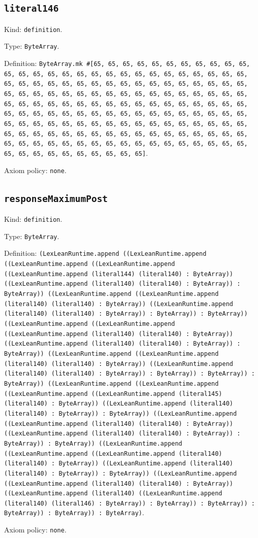 \documentclass[11pt]{article}
\begin{document}
\subsection*{\texttt{literal146}}
\noindent Kind: \texttt{definition}.\par
\noindent Type: \texttt{ByteArray}.\par
\noindent Definition: \texttt{ByteArray.mk \#[65, 65, 65, 65, 65, 65, 65, 65, 65, 65, 65, 65, 65, 65, 65, 65, 65, 65, 65, 65, 65, 65, 65, 65, 65, 65, 65, 65, 65, 65, 65, 65, 65, 65, 65, 65, 65, 65, 65, 65, 65, 65, 65, 65, 65, 65, 65, 65, 65, 65, 65, 65, 65, 65, 65, 65, 65, 65, 65, 65, 65, 65, 65, 65, 65, 65, 65, 65, 65, 65, 65, 65, 65, 65, 65, 65, 65, 65, 65, 65, 65, 65, 65, 65, 65, 65, 65, 65, 65, 65, 65, 65, 65, 65, 65, 65, 65, 65, 65, 65, 65, 65, 65, 65, 65, 65, 65, 65, 65, 65, 65, 65, 65, 65, 65, 65, 65, 65, 65, 65, 65, 65, 65, 65, 65, 65, 65, 65, 65, 65, 65, 65, 65, 65, 65, 65, 65, 65, 65, 65, 65, 65, 65, 65, 65, 65, 65, 65, 65, 65, 65, 65, 65, 65, 65, 65, 65]}.\par
\noindent Axiom policy: \texttt{none}.\par
\subsection*{\texttt{responseMaximumPost}}
\noindent Kind: \texttt{definition}.\par
\noindent Type: \texttt{ByteArray}.\par
\noindent Definition: \texttt{(LexLeanRuntime.append ((LexLeanRuntime.append ((LexLeanRuntime.append ((LexLeanRuntime.append ((LexLeanRuntime.append (literal144) (literal140) : ByteArray)) ((LexLeanRuntime.append (literal140) (literal140) : ByteArray)) : ByteArray)) ((LexLeanRuntime.append ((LexLeanRuntime.append (literal140) (literal140) : ByteArray)) ((LexLeanRuntime.append (literal140) (literal140) : ByteArray)) : ByteArray)) : ByteArray)) ((LexLeanRuntime.append ((LexLeanRuntime.append ((LexLeanRuntime.append (literal140) (literal140) : ByteArray)) ((LexLeanRuntime.append (literal140) (literal140) : ByteArray)) : ByteArray)) ((LexLeanRuntime.append ((LexLeanRuntime.append (literal140) (literal140) : ByteArray)) ((LexLeanRuntime.append (literal140) (literal140) : ByteArray)) : ByteArray)) : ByteArray)) : ByteArray)) ((LexLeanRuntime.append ((LexLeanRuntime.append ((LexLeanRuntime.append ((LexLeanRuntime.append (literal145) (literal140) : ByteArray)) ((LexLeanRuntime.append (literal140) (literal140) : ByteArray)) : ByteArray)) ((LexLeanRuntime.append ((LexLeanRuntime.append (literal140) (literal140) : ByteArray)) ((LexLeanRuntime.append (literal140) (literal140) : ByteArray)) : ByteArray)) : ByteArray)) ((LexLeanRuntime.append ((LexLeanRuntime.append ((LexLeanRuntime.append (literal140) (literal140) : ByteArray)) ((LexLeanRuntime.append (literal140) (literal140) : ByteArray)) : ByteArray)) ((LexLeanRuntime.append ((LexLeanRuntime.append (literal140) (literal140) : ByteArray)) ((LexLeanRuntime.append (literal140) ((LexLeanRuntime.append (literal140) (literal146) : ByteArray)) : ByteArray)) : ByteArray)) : ByteArray)) : ByteArray)) : ByteArray)}.\par
\noindent Axiom policy: \texttt{none}.\par
\end{document}
